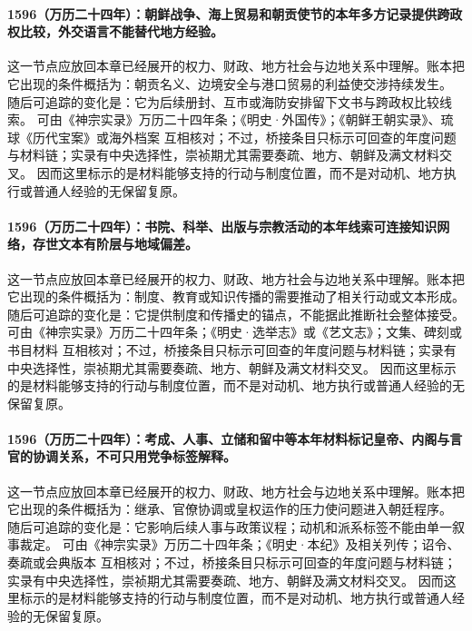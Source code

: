 \paragraph{1596（万历二十四年）：朝鲜战争、海上贸易和朝贡使节的本年多方记录提供跨政权比较，外交语言不能替代地方经验。} 这一节点应放回本章已经展开的权力、财政、地方社会与边地关系中理解。账本把它出现的条件概括为：朝贡名义、边境安全与港口贸易的利益使交涉持续发生。 随后可追踪的变化是：它为后续册封、互市或海防安排留下文书与跨政权比较线索。 可由《神宗实录》万历二十四年条；《明史·外国传》；《朝鲜王朝实录》、琉球《历代宝案》或海外档案 互相核对；不过，桥接条目只标示可回查的年度问题与材料链；实录有中央选择性，崇祯期尤其需要奏疏、地方、朝鲜及满文材料交叉。 因而这里标示的是材料能够支持的行动与制度位置，而不是对动机、地方执行或普通人经验的无保留复原。

\paragraph{1596（万历二十四年）：书院、科举、出版与宗教活动的本年线索可连接知识网络，存世文本有阶层与地域偏差。} 这一节点应放回本章已经展开的权力、财政、地方社会与边地关系中理解。账本把它出现的条件概括为：制度、教育或知识传播的需要推动了相关行动或文本形成。 随后可追踪的变化是：它提供制度和传播史的锚点，不能据此推断社会整体接受。 可由《神宗实录》万历二十四年条；《明史·选举志》或《艺文志》；文集、碑刻或书目材料 互相核对；不过，桥接条目只标示可回查的年度问题与材料链；实录有中央选择性，崇祯期尤其需要奏疏、地方、朝鲜及满文材料交叉。 因而这里标示的是材料能够支持的行动与制度位置，而不是对动机、地方执行或普通人经验的无保留复原。

\paragraph{1596（万历二十四年）：考成、人事、立储和留中等本年材料标记皇帝、内阁与言官的协调关系，不可只用党争标签解释。} 这一节点应放回本章已经展开的权力、财政、地方社会与边地关系中理解。账本把它出现的条件概括为：继承、官僚协调或皇权运作的压力使问题进入朝廷程序。 随后可追踪的变化是：它影响后续人事与政策议程；动机和派系标签不能由单一叙事裁定。 可由《神宗实录》万历二十四年条；《明史·本纪》及相关列传；诏令、奏疏或会典版本 互相核对；不过，桥接条目只标示可回查的年度问题与材料链；实录有中央选择性，崇祯期尤其需要奏疏、地方、朝鲜及满文材料交叉。 因而这里标示的是材料能够支持的行动与制度位置，而不是对动机、地方执行或普通人经验的无保留复原。

